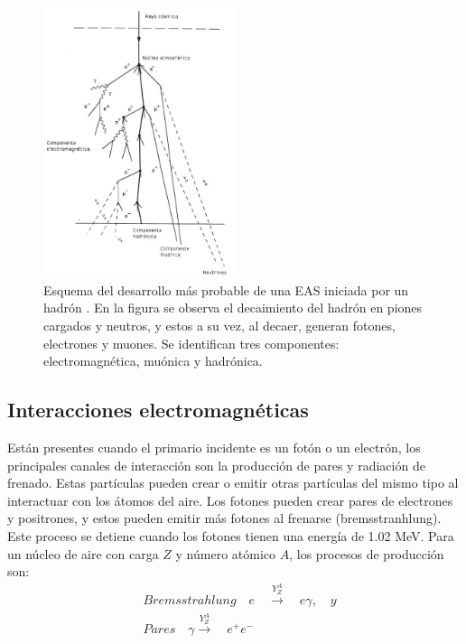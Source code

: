 \begin{figure}[htb!]
\centering
    \begin{center}
        \includegraphics[width=0.5\textwidth]{Figs/componentes_cas.jpg}
    \end{center}{}
    \caption[Esquema del desarrollo de una EAS iniciada por un hadrón.]{Esquema del desarrollo más probable de una EAS iniciada por un hadrón \cite{mauro:tesis}. En la figura se observa el decaimiento del hadrón en piones cargados y neutros, y estos a su vez, al decaer, generan fotones, electrones y muones. Se identifican tres componentes: electromagnética, muónica y hadrónica.}
    \label{fig:fig3}
\end{figure}

\subsection{Interacciones electromagnéticas}
Están presentes cuando el primario incidente es un fotón o un electrón, los principales canales de interacción son la producción de pares y radiación de frenado. Estas partículas pueden crear o emitir otras partículas del mismo tipo al interactuar con los átomos del aire. Los fotones pueden crear pares de electrones y positrones, y estos pueden emitir más fotones al frenarse (bremsstranhlung). Este proceso se detiene cuando los fotones tienen una energía de 1.02 MeV. Para un núcleo de aire con carga $Z$ y número atómico $A$, los procesos de producción son:
\begin{equation}
\begin{split}
&Bremsstrahlung\quad e \quad \xrightarrow{Y^{A}_{Z}} \quad e\gamma ,  \quad y \\
&Pares \quad \gamma \xrightarrow{Y^{A}_{Z}} \quad e^{+}e^{-} \\
\end{split}
\end{equation} 

